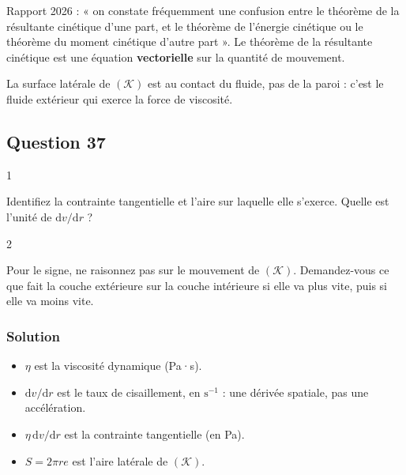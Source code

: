 \documentclass[11pt,a4paper]{article}
\providecommand{\tightlist}{\setlength{\itemsep}{0pt}\setlength{\parskip}{0pt}}
\begin{document}
\begin{piege}

Rapport 2026 : « on constate fréquemment une confusion entre le théorème de la résultante cinétique d'une part, et le théorème de l'énergie cinétique ou le théorème du moment cinétique d'autre part ». Le théorème de la résultante cinétique est une équation \textbf{vectorielle} sur la quantité de mouvement.

\end{piege}

\begin{piege}

La surface latérale de \((\mathcal K)\) est au contact du fluide, pas de la paroi : c'est le fluide extérieur qui exerce la force de viscosité.

\end{piege}

\hypertarget{question-37}{%
\subsection{Question 37}\label{question-37}}

\begin{indication}{1}

Identifiez la contrainte tangentielle et l'aire sur laquelle elle s'exerce. Quelle est l'unité de \(\mathrm dv/\mathrm dr\) ?

\end{indication}

\begin{indication}{2}

Pour le signe, ne raisonnez pas sur le mouvement de \((\mathcal K)\). Demandez-vous ce que fait la couche extérieure sur la couche intérieure si elle va plus vite, puis si elle va moins vite.

\end{indication}

\hypertarget{solution-36}{%
\subsubsection{Solution}\label{solution-36}}

\begin{itemize}
\tightlist
\item
  \(\eta\) est la viscosité dynamique (Pa·s).
\item
  \(\mathrm dv/\mathrm dr\) est le taux de cisaillement, en \(\mathrm s^{-1}\) : une dérivée spatiale, pas une accélération.
\item
  \(\eta\,\mathrm dv/\mathrm dr\) est la contrainte tangentielle (en Pa).
\item
  \(S=2\pi re\) est l'aire latérale de \((\mathcal K)\).
\end{itemize}
\end{document}
